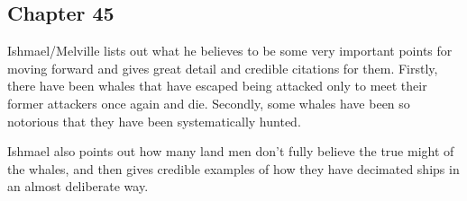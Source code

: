 \subsection{Chapter 45}

Ishmael/Melville lists out what he believes to be some very important points
for moving forward and gives great detail and credible citations for them.
Firstly, there have been whales that have escaped being attacked only to meet
their former attackers once again and die. Secondly, some whales have been so
notorious that they have been systematically hunted.

Ishmael also points out how many land men don't fully believe the true might of
the whales, and then gives credible examples of how they have decimated ships
in an almost deliberate way.
